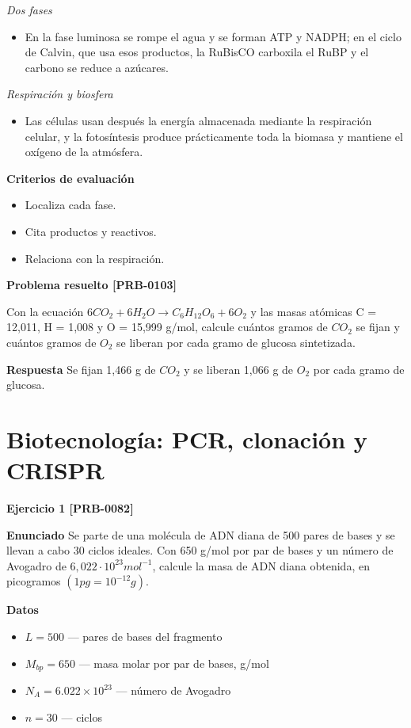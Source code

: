 \documentclass{book}
\begin{document}
\noindent\textit{Dos fases}
\begin{itemize}
\item En la fase luminosa se rompe el agua y se forman ATP y NADPH; en el ciclo de Calvin, que usa esos productos, la RuBisCO carboxila el RuBP y el carbono se reduce a azúcares.
\end{itemize}

\noindent\textit{Respiración y biosfera}
\begin{itemize}
\item Las células usan después la energía almacenada mediante la respiración celular, y la fotosíntesis produce prácticamente toda la biomasa y mantiene el oxígeno de la atmósfera.
\end{itemize}

\noindent\textbf{Criterios de evaluación}
\begin{itemize}
\item Localiza cada fase.
\item Cita productos y reactivos.
\item Relaciona con la respiración.
\end{itemize}

\noindent\textbf{Problema resuelto [PRB-0103]}

Con la ecuación \(6 CO_{2} + 6 H_{2}O \to C_{6}H_{12}O_{6} + 6 O_{2}\) y las masas atómicas C = 12,011, H = 1,008 y O = 15,999 g/mol, calcule cuántos gramos de \(CO_{2}\) se fijan y cuántos gramos de \(O_{2}\) se liberan por cada gramo de glucosa sintetizada.


\noindent\textbf{Respuesta}
Se fijan 1,466 g de \(CO_{2}\) y se liberan 1,066 g de \(O_{2}\) por cada gramo de glucosa.


\section{Biotecnología: PCR, clonación y CRISPR}

\noindent\textbf{Ejercicio 1 [PRB-0082]}

\noindent\textbf{Enunciado}
Se parte de una molécula de ADN diana de 500 pares de bases y se llevan a cabo 30 ciclos ideales. Con 650 g/mol por par de bases y un número de Avogadro de \(6,022\cdot10^{23} mol^{-1}\), calcule la masa de ADN diana obtenida, en picogramos \((1 pg = 10^{-12} g)\).


\noindent\textbf{Datos}
\begin{itemize}
\item $L = 500$ — pares de bases del fragmento
\item $M_{bp} = 650$ — masa molar por par de bases, g/mol
\item $N_{A} = 6.022\times 10^{23}$ — número de Avogadro
\item $n = 30$ — ciclos
\end{itemize}
\end{document}
